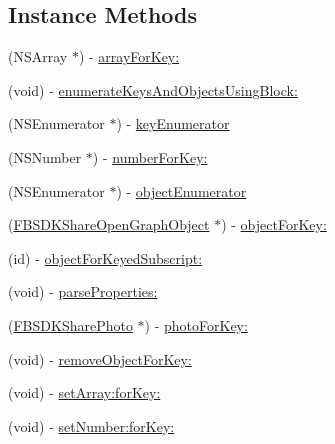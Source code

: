 \subsection*{Instance Methods}
\begin{DoxyCompactItemize}
\item 
(N\-S\-Array $\ast$) -\/ \hyperlink{protocol_f_b_s_d_k_share_open_graph_value_containing-p_a296592db96a532877e7a5cce0252bbc6}{array\-For\-Key\-:}
\item 
(void) -\/ \hyperlink{protocol_f_b_s_d_k_share_open_graph_value_containing-p_a62dbeb11b58ab43a5975f17a3ee51ce6}{enumerate\-Keys\-And\-Objects\-Using\-Block\-:}
\item 
(N\-S\-Enumerator $\ast$) -\/ \hyperlink{protocol_f_b_s_d_k_share_open_graph_value_containing-p_a80eba6494b84b59ae6c27775d3a5f81f}{key\-Enumerator}
\item 
(N\-S\-Number $\ast$) -\/ \hyperlink{protocol_f_b_s_d_k_share_open_graph_value_containing-p_a90d69b7b3128d073821f0cc8bb72a8f7}{number\-For\-Key\-:}
\item 
(N\-S\-Enumerator $\ast$) -\/ \hyperlink{protocol_f_b_s_d_k_share_open_graph_value_containing-p_aa449ffe58bd3d27792b6a59bbbc0f571}{object\-Enumerator}
\item 
(\hyperlink{interface_f_b_s_d_k_share_open_graph_object}{F\-B\-S\-D\-K\-Share\-Open\-Graph\-Object} $\ast$) -\/ \hyperlink{protocol_f_b_s_d_k_share_open_graph_value_containing-p_a1518ffed79b4dea61403b75fff4fe7d5}{object\-For\-Key\-:}
\item 
(id) -\/ \hyperlink{protocol_f_b_s_d_k_share_open_graph_value_containing-p_a2f5dd5bfdff32ca96e158518697f5b5b}{object\-For\-Keyed\-Subscript\-:}
\item 
(void) -\/ \hyperlink{protocol_f_b_s_d_k_share_open_graph_value_containing-p_a695bc758d53d5d672f6f81d3b35d784d}{parse\-Properties\-:}
\item 
(\hyperlink{interface_f_b_s_d_k_share_photo}{F\-B\-S\-D\-K\-Share\-Photo} $\ast$) -\/ \hyperlink{protocol_f_b_s_d_k_share_open_graph_value_containing-p_ae9750f9a444b9bb2d0a4f48603c903ce}{photo\-For\-Key\-:}
\item 
(void) -\/ \hyperlink{protocol_f_b_s_d_k_share_open_graph_value_containing-p_a18252524450570cb538c94abe1353f83}{remove\-Object\-For\-Key\-:}
\item 
(void) -\/ \hyperlink{protocol_f_b_s_d_k_share_open_graph_value_containing-p_a5284cc7bcdbc78c66eb45c73828879a8}{set\-Array\-:for\-Key\-:}
\item 
(void) -\/ \hyperlink{protocol_f_b_s_d_k_share_open_graph_value_containing-p_af28a24ae072bda75f06652511b9274bb}{set\-Number\-:for\-Key\-:}

\end{DoxyCompactItemize}

